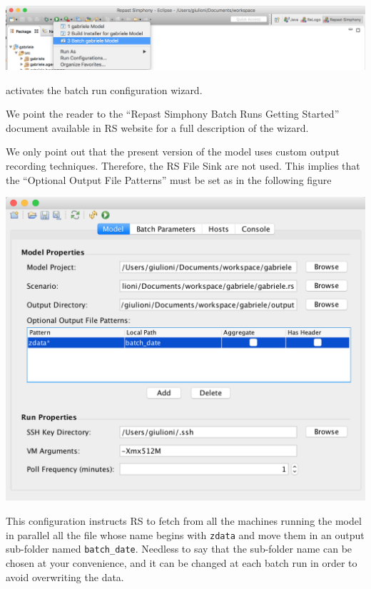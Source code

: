 \documentclass{book}
\begin{document}
\noindent
\includegraphics[scale=0.35]{fig_gabriele_rs_execution3}

activates the batch run configuration wizard.

We point the reader to the ``Repast Simphony Batch Runs Getting Started'' document available in RS website for a full description of the wizard.

We only point out that the present version of the model uses custom output recording techniques. Therefore, the RS File Sink are not used. This implies that the ``Optional Output File Patterns'' must be set as in the following figure

\noindent
\includegraphics[scale=0.35]{fig_gabriele_rs_batch}

This configuration instructs RS to fetch from all the machines running the model in parallel all the file whose name begins with \verb+zdata+  and move them in an output sub-folder named 
\verb+batch_date+. Needless to say that the sub-folder name can be chosen at your convenience, and it can be changed at each batch run in order to avoid overwriting the data.
\end{document}
